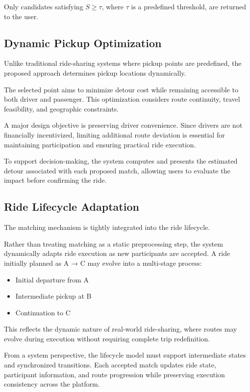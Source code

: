 Only candidates satisfying $S \geq \tau$, where $\tau$ is a predefined threshold, are returned to the user.

\subsection{Dynamic Pickup Optimization}

Unlike traditional ride-sharing systems where pickup points are predefined, the proposed approach determines pickup locations dynamically.

The selected point aims to minimize detour cost while remaining accessible to both driver and passenger. This optimization considers route continuity, travel feasibility, and geographic constraints.

A major design objective is preserving driver convenience. Since drivers are not financially incentivized, limiting additional route deviation is essential for maintaining participation and ensuring practical ride execution.

To support decision-making, the system computes and presents the estimated detour associated with each proposed match, allowing users to evaluate the impact before confirming the ride.

\subsection{Ride Lifecycle Adaptation}

The matching mechanism is tightly integrated into the ride lifecycle.

Rather than treating matching as a static preprocessing step, the system dynamically adapts ride execution as new participants are accepted. A ride initially planned as A → C may evolve into a multi-stage process:

\begin{itemize}
    \item Initial departure from A
    \item Intermediate pickup at B
    \item Continuation to C
\end{itemize}

This reflects the dynamic nature of real-world ride-sharing, where routes may evolve during execution without requiring complete trip redefinition.

From a system perspective, the lifecycle model must support intermediate states and synchronized transitions. Each accepted match updates ride state, participant information, and route progression while preserving execution consistency across the platform.

